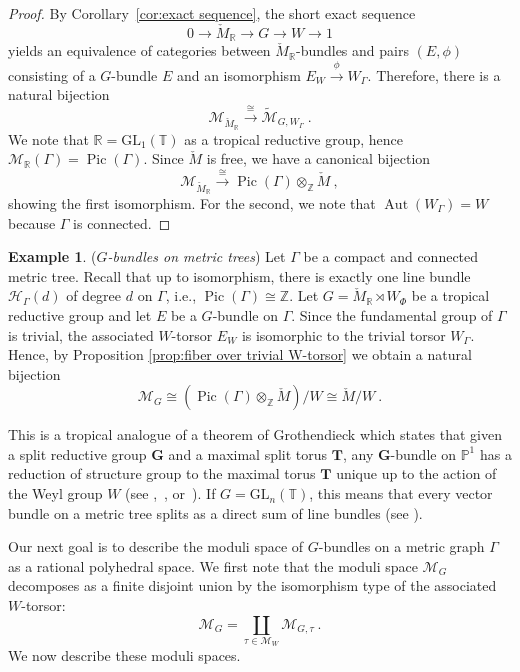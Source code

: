\documentclass[10pt, a4paper]{amsart}
\theoremstyle{definition}
\newtheorem{example}[theorem]{Example}
\theoremstyle{myitemstyle}
\newcommand{\R}{\mathbb{R}}
\newcommand{\Z}{\mathbb{Z}}
\newcommand{\ZZ}{\mathbb{Z}}
\newcommand{\PP}{\mathbb{P}}
\newcommand{\RR}{\mathbb{R}}
\newcommand{\TT}{\mathbb{T}}
\newcommand{\T}{\mathbb{T}}
\newcommand{\Mcheck}{{\check{M}}}
\newcommand{\calH}{\mathcal{H}}
\newcommand{\calM}{\mathcal{M}}
\newcommand{\bfG}{\mathbf{G}}
\newcommand{\bfT}{\mathbf{T}}
\newcommand{\mc}[1]{{\mathcal{#1}}}
\DeclareMathOperator{\Pic}{Pic}
\DeclareMathOperator{\Aut}{Aut}
\newcommand{\GL}{{\mathrm{GL}}}
\begin{document}
\begin{proof} By Corollary~\ref{cor:exact sequence}, the short exact sequence
    \[
    0\longrightarrow \Mcheck_\R\longrightarrow G\longrightarrow W\longrightarrow 1
    \]
    yields an equivalence of categories between $\Mcheck_\R$-bundles and pairs $(E,\phi)$ consisting of a $G$-bundle $E$ and an isomorphism $E_W\xrightarrow{\phi}W_\Gamma$. Therefore, there is a natural bijection
    \[
    \mc M_{\Mcheck_\R} \xrightarrow{\cong} \widetilde{\mc M}_{G,W_\Gamma} \ .
    \]
    We note that $\RR=\GL_1(\TT)$ as a tropical reductive group, hence $\mc M_\R(\Gamma)=\Pic(\Gamma)$. Since $\Mcheck$ is free, we have a canonical bijection
    \[
    \mc M_{\Mcheck_\R}\xrightarrow{\cong}\Pic(\Gamma)\otimes_\Z \Mcheck \ ,
    \]
    showing the first isomorphism. For the second, we note that $\Aut(W_\Gamma)=W$ because $\Gamma$ is connected.
\end{proof}

\begin{example}(\textit{$G$-bundles on metric trees})
\label{exa:bundlestrees}
Let $\Gamma$ be a compact and connected metric tree. Recall that up to isomorphism, there is exactly one line bundle $\calH_{\Gamma}(d)$ of degree $d$ on $\Gamma$, i.e., $\Pic(\Gamma) \cong \ZZ.$ Let $G = \Mcheck_\RR \rtimes W_\Phi$ be a tropical reductive group and let $E$ be a $G$-bundle on $\Gamma$. Since the fundamental group of $\Gamma$ is trivial, the associated $W$-torsor $E_W$ is isomorphic to the trivial torsor $W_\Gamma$. Hence, by Proposition \ref{prop:fiber over trivial W-torsor} we obtain a natural bijection 
\[
\calM_G \cong (\Pic(\Gamma) \otimes_\ZZ \Mcheck)/W \cong \Mcheck /W \ .
\]

This is a tropical analogue of a theorem of Grothendieck which states that given a split reductive group $\bfG$ and a maximal split torus $\bfT$, any $\bfG$-bundle on $\PP^1$ has a reduction of structure group to the maximal torus $\bfT$ unique up to the action of the Weyl group $W$ (see \cite{Grothendieck_vectorbundlesonP1},~\cite{1968Harder}, or~\cite[Theorem 0.3]{MartensThaddeus_Grothendieck}). If $G = \GL_n(\T)$, this means that every vector bundle on a metric tree splits as a direct sum of line bundles (see \cite[Example 3.3]{2022GrossUlirschZakharov}).
    
\end{example}

Our next goal is to describe the moduli space of $G$-bundles on a metric graph $\Gamma$ as a rational polyhedral space. We first note that the moduli space $\calM_G$ decomposes as a finite disjoint union by the isomorphism type of the associated $W$-torsor:
\[
\calM_G=\coprod_{\tau\in \calM_{W}}\calM_{G,\tau} \ .
\]
We now describe these moduli spaces.
\end{document}
